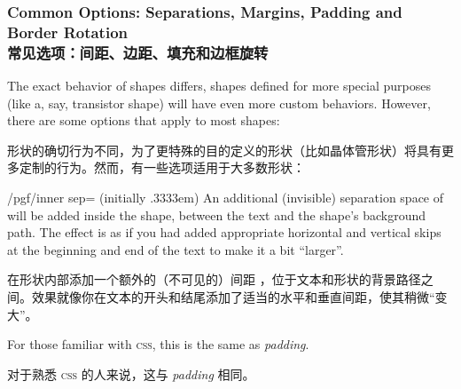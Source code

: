 \begin{codeexample}[]
\end{codeexample}


\subsubsection{Common Options: Separations, Margins, Padding and
               Border Rotation\\常见选项：间距、边距、填充和边框旋转}
\label{section-shape-seps}
\label{section-shape-common-options}

The  exact behavior of shapes
differs, shapes defined for more special purposes (like a, say, transistor
shape) will have even more custom behaviors. However, there are some options
that apply to most shapes:

形状的确切行为不同，为了更特殊的目的定义的形状（比如晶体管形状）将具有更多定制的行为。然而，有一些选项适用于大多数形状：

\begin{key}{/pgf/inner sep= (initially .3333em)}
    An additional (invisible) separation space of  will be
    added inside the shape, between the text and the shape's background path.
    The effect is as if you had added appropriate horizontal and vertical skips
    at the beginning and end of the text to make it a bit ``larger''.

    在形状内部添加一个额外的（不可见的）间距 ，位于文本和形状的背景路径之间。效果就像你在文本的开头和结尾添加了适当的水平和垂直间距，使其稍微“变大”。



    For those familiar with \textsc{css}, this is the same as \emph{padding}.
    
    对于熟悉 \textsc{css} 的人来说，这与 \emph{padding} 相同。
\begin{codeexample}[]
\end{codeexample}
\end{key}

